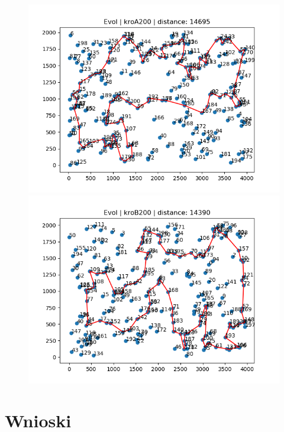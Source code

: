 \documentclass{article}
\begin{document}
\begin{figure}[h!]
  \centering
  \begin{minipage}[b]{0.8\textwidth}
    \includegraphics[width=\textwidth]{Evol_kroA200.png}
  \end{minipage}

  \begin{minipage}[b]{0.8\textwidth}
    \includegraphics[width=\textwidth]{Evol_kroB200.png}
  \end{minipage}
  
\end{figure}


\section{Wnioski}
\end{document}
